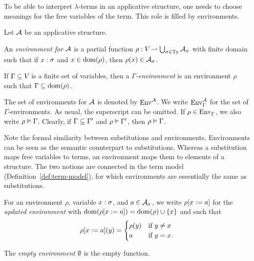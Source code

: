 To be able to interpret $\lambda$-terms in an applicative structure, one needs to choose meanings for the free variables of the term. This role is filled by environments.

\begin{defn}[Environment] \label{def:environment}
Let $\struct{A}$ be an applicative structure.
\begin{enum}
\item An \emph{environment for $\struct{A}$} is a partial function $\rho : \Var \pto \bigcup_{\sigma \in \Ty}{\scomp{\struct{A}}{\sigma}}$ with finite domain such that if $\typedvar{x}{\sigma}$ and $x \in \dom{\rho}$, then $\rho(x) \in \scomp{\struct{A}}{\sigma}$.

\item If $\Gamma \subs \Var$ is a finite set of variables, then a \emph{$\Gamma$-environment} is an environment $\rho$ such that $\Gamma \subs \dom{\rho}$.
\end{enum}
\end{defn}

The set of environments for $\struct{A}$ is denoted by $\Env[][\struct{A}]$. We write $\Env[\Gamma][\struct{A}]$ for the set of $\Gamma$-environments. As usual, the superscript can be omitted. If $\rho \in \Env[\Gamma]$, we also write $\typedenv{\rho}{\Gamma}$. Clearly, if $\Gamma \subs \Gamma'$ and $\typedenv{\rho}{\Gamma'}$, then $\typedenv{\rho}{\Gamma}$.

Note the formal similarity between substitutions and environments. Environments can be seen as the semantic counterpart to substitutions. Whereas a substitution maps free variables to terms, an environment maps them to elements of a structure. The two notions are connected in the term model (Definition~\ref{def:term-model}), for which environments are essentially the same as substitutions.

\begin{notn} \label{not:environments}
\hfill \vspace{-3pt}
\begin{items}
\item For an environment $\rho$, variable $\typedvar{x}{\sigma}$, and $a \in \scomp{\struct{A}}{\sigma}$, we write $\updenv{\rho}{x}{a}$ for the \emph{updated environment} with $\dom{\updenv{\rho}{x}{a}} = \dom{\rho} \cup \singset[x]$ and such that
\[ \updenv{\rho}{x}{a}(y) = \begin{cases}
                            \rho(y) & \text{if } y \ne x \\
                            a & \text{if } y = x.
                            \end{cases} \]

\item The \emph{empty environment} $\empenv$ is the empty function.
\end{items}
\end{notn}

